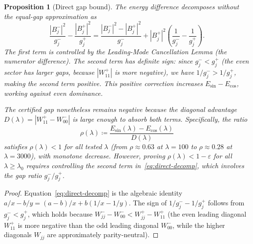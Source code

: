 \documentclass[12pt,a4paper]{article}
\newtheorem{proposition}[theorem]{Proposition}
\theoremstyle{definition}
\theoremstyle{remark}
\begin{document}
\begin{proposition}[Direct gap bound]
\label{prop:direct-gap}
The energy difference decomposes without the equal-gap approximation as
\begin{equation}
\label{eq:direct-decomp}
  \frac{|B_j^-|^2}{g_j^-} - \frac{|B_j^+|^2}{g_j^+}
  = \frac{|B_j^-|^2 - |B_j^+|^2}{g_j^-} + |B_j^+|^2\!\left(\frac{1}{g_j^-} - \frac{1}{g_j^+}\right).
\end{equation}
The first term is controlled by the Leading-Mode Cancellation Lemma (the numerator difference). The second term has definite sign: since $g_j^- < g_j^+$ (the even sector has larger gaps, because $|W_{11}^+|$ is more negative), we have $1/g_j^- > 1/g_j^+$, making the second term \emph{positive}. This positive correction \emph{increases} $E_{\sin} - E_{\cos}$, working \emph{against} even dominance.

The certified gap nonetheless remains negative because the diagonal advantage $D(\lambda) = |W_{11}^+ - W_{00}^-|$ is large enough to absorb both terms. Specifically, the ratio
\[
  \rho(\lambda) \coloneqq \frac{E_{\sin}(\lambda) - E_{\cos}(\lambda)}{D(\lambda)}
\]
satisfies $\rho(\lambda) < 1$ for all tested $\lambda$ (from $\rho \approx 0.63$ at $\lambda = 100$ to $\rho \approx 0.28$ at $\lambda = 3000$), with monotone decrease. However, proving $\rho(\lambda) < 1 - \varepsilon$ for all $\lambda \geq \lambda_0$ requires controlling the second term in~\eqref{eq:direct-decomp}, which involves the gap ratio $g_j^-/g_j^+$.
\end{proposition}

\begin{proof}
Equation~\eqref{eq:direct-decomp} is the algebraic identity $a/x - b/y = (a-b)/x + b(1/x - 1/y)$. The sign of $1/g_j^- - 1/g_j^+$ follows from $g_j^- < g_j^+$, which holds because $W_{jj}^- - W_{00}^- < W_{jj}^+ - W_{11}^+$ (the even leading diagonal $W_{11}^+$ is more negative than the odd leading diagonal $W_{00}^-$, while the higher diagonals $W_{jj}$ are approximately parity-neutral).
\end{proof}
\end{document}
